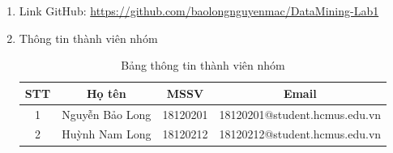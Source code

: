 \documentclass[a4paper, 12pt]{article}
\begin{document}
\begin{enumerate}
    \item Link GitHub: \url{https://github.com/baolongnguyenmac/DataMining-Lab1}
    \item Thông tin thành viên nhóm
    \begin{table}[H]
        \begin{center}
            \begin{tabular}{|c|c|c|c|}
            \hline
            STT & Họ tên          & MSSV     & Email                         \\ \hline
            1   & Nguyễn Bảo Long & 18120201 & 18120201@student.hcmus.edu.vn \\ \hline
            2   & Huỳnh Nam Long  & 18120212 & 18120212@student.hcmus.edu.vn         \\ \hline
            \end{tabular}
            \caption{Bảng thông tin thành viên nhóm}
        \end{center}
    \end{table}


\end{enumerate}
\end{document}
